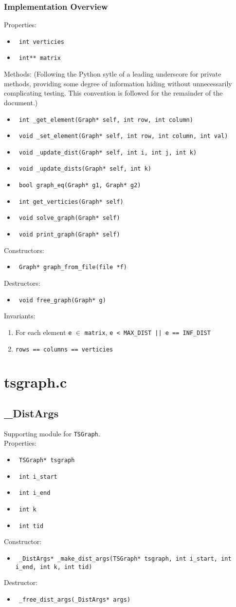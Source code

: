 \documentclass{article}
\newcommand{\field}[1]{\item \texttt{ #1 }}
\begin{document}
\subsubsection{Implementation Overview}
Properties:
\begin{itemize}
  \field{int verticies}
  \field{int** matrix}\\
\end{itemize}
Methods:
(Following the Python sytle of a leading underscore for private
methods, providing some degree of information hiding without
unnecessarily complicating testing. This convention is followed for
the remainder of the document.)
\begin{itemize}
  \field{int \_get\_element(Graph* self, int row, int column)}
  \field{void \_set\_element(Graph* self, int row, int column, int
    val)}
  \field{void \_update\_dist(Graph* self, int i, int j, int k)}
  \field{void \_update\_dists(Graph* self, int k)}
  \field{bool graph\_eq(Graph* g1, Graph* g2)}
  \field{int get\_verticies(Graph* self)}
  \field{void solve\_graph(Graph* self)}
  \field{void print\_graph(Graph* self)}\\
\end{itemize}
Constructors:
\begin{itemize}
  \field{Graph* graph\_from\_file(file *f)}\\
\end{itemize}
Destructors:
\begin{itemize}
  \field{void free\_graph(Graph* g)}\\
\end{itemize}
Invariants: 
\begin{enumerate}
\item For each element \texttt{e} $\in$ \texttt{matrix}, \texttt{e <
    MAX\_DIST || e == INF\_DIST}
\item \texttt{rows == columns == verticies}
\end{enumerate}

\section{tsgraph.c}
\subsection{\_DistArgs}
Supporting module for \texttt{TSGraph}.\smallskip\\ 
Properties:
\begin{itemize}
  \field{TSGraph* tsgraph}
  \field{int i\_start}
  \field{int i\_end}
  \field{int k}
  \field{int tid}\\
\end{itemize}
Constructor:
\begin{itemize}
  \field{\_DistArgs* \_make\_dist\_args(TSGraph* tsgraph, int i\_start, int i\_end,
    int k, int tid)}\\
\end{itemize}
Destructor:
\begin{itemize}
  \field{\_free\_dist\_args(\_DistArgs* args)}
\end{itemize}
\end{document}
